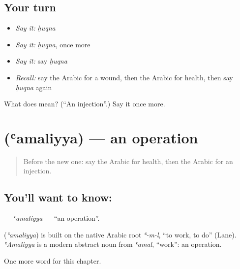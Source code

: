 \subsection*{Your turn}
\begin{itemize}
\raggedright
  \item \emph{Say it:} \emph{ḥuqna}
  \item \emph{Say it:} \emph{ḥuqna}, once more
  \item \emph{Say it:} say \emph{ḥuqna}
  \item \emph{Recall:} say the Arabic for a wound, then the Arabic for health, then say \emph{ḥuqna} again
\end{itemize}

\begin{tcolorbox}[breakable,colback=teal!4,colframe=teal!35!black,title={Before you move on}]
What does  mean? (\textquotedblleft{}An injection\textquotedblright{}.) Say it once more.
\end{tcolorbox}
\section[\texorpdfstring{\ar{عملية} (ʿamaliyya)}{عملية (ʿamaliyya)}]{ (ʿamaliyya) — an operation}

\label{lesson:AR-C201-amaliyya}



\begin{quote}
Before the new one: say the Arabic for health, then the Arabic for an injection.
\end{quote}

\subsection*{You'll want to know: }
\textbf{} — \emph{ʿamaliyya} — \textquotedblleft{}an operation\textquotedblright{}.

\begin{cousinweb}
\textbf{} (\emph{ʿamaliyya}) is built on the native Arabic root \emph{ʿ-m-l}, \textquotedblleft{}to work, to do\textquotedblright{} (Lane). \emph{ʿAmaliyya} is a modern abstract noun from \emph{ʿamal}, \textquotedblleft{}work\textquotedblright{}: an operation.
\end{cousinweb}

\begin{grammarlens}[title={What you've built}]
One more word for this chapter.
\end{grammarlens}

